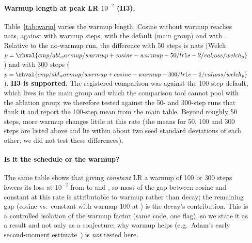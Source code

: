 \label{sec:abl}
\paragraph{Warmup length at peak LR $10^{-2}$ (H3).} Table~\ref{tab:warm} varies the warmup length. Cosine without warmup reaches  nats, against  with  warmup steps,  with the default  (main group) and  with . Relative to the no-warmup run, the difference with 50 steps is  nats (Welch $p=\rhval{cmp/abl_warmup/warmup+cosine-warmup-50/lr1e-2/val_loss/welch_p}$) and with 300 steps  ($p=\rhval{cmp/abl_warmup/warmup+cosine-warmup-300/lr1e-2/val_loss/welch_p}$). \textbf{H3 is supported.} The registered comparison was against the 100-step default, which lives in the main group and which the comparison tool cannot pool with the ablation group; we therefore tested against the 50- and 300-step runs that flank it and report the 100-step mean from the main table. Beyond roughly 50 steps, more warmup changes little at this rate (the means for 50, 100 and 300 steps are listed above and lie within about two seed standard deviations of each other; we did not test these differences).

\begin{table}[t]\centering\caption{Warmup ablation at peak LR $10^{-2}$ (validation loss).}\label{tab:warm}
\resizebox{\columnwidth}{!}{}\end{table}

\paragraph{Is it the schedule or the warmup?} The same table shows that giving \emph{constant} LR a warmup of 100 or 300 steps lowers its loss at $10^{-2}$ from  to  and , so most of the gap between cosine and constant at this rate is attributable to warmup rather than decay; the remaining gap (cosine  vs.\ constant with warmup 100 at ) is the decay's contribution. This is a controlled isolation of the warmup factor (same code, one flag), so we state it as a result and not only as a conjecture; why warmup helps (e.g.\ Adam's early second-moment estimate~\cite{liu2019variance}) is \emph{not} tested here.

